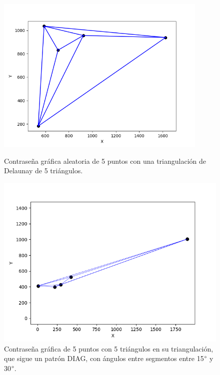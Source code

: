 \documentclass[12pt]{report}
\begin{document}
	\begin{figure}[h]
	\centering
	\begin{minipage}{0.45\textwidth}
		\centering
		\includegraphics[width=0.9\textwidth]{alea5td.png}
		\caption{Contraseña gráfica aleatoria de 5 puntos con una triangulación de Delaunay de 5 triángulos.}
		\label{5TD}
		
	\end{minipage}\hfill
	\begin{minipage}{0.45\textwidth}
		\centering
		\includegraphics[width=0.9\linewidth]{5td30.png}  %
		\caption{Contraseña gráfica de 5 puntos con 5 triángulos en su triangulación, que sigue un patrón DIAG, con ángulos entre segmentos entre 15$\degree$ y 30$\degree$.}
		\label{5td30}
	\end{minipage}
\end{figure}
\end{document}
